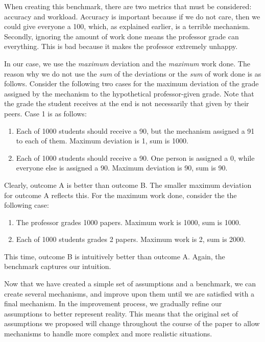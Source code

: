 \documentclass[12pt, Arial]{article}
\begin{document}
When creating this benchmark, there are two metrics that must be considered: accuracy and workload. Accuracy is important because if we do not care, then we could give everyone a 100, which, as explained earlier, is a terrible mechanism. Secondly, ignoring the amount of work done means the professor grade can everything. This is bad because it makes the professor extremely unhappy.

In our case, we use the \emph{maximum} deviation and the \emph{maximum} work done. The reason why we do not use the \emph{sum} of the deviations or the \emph{sum} of work done is as follows. Consider the following two cases for the maximum deviation of the grade assigned by the mechanism to the hypothetical professor-given grade. Note that the grade the student receives at the end is not necessarily that given by their peers. Case 1 is as follows:
\begin{enumerate}[label=\Alph*]
	\item Each of 1000 students should receive a 90, but the mechanism assigned a 91 to each of them. Maximum deviation is 1, sum is 1000.
	\item Each of 1000 students should receive a 90. One person is assigned a 0, while everyone else is assigned a 90. Maximum deviation is 90, sum is 90.
\end{enumerate}
Clearly, outcome A is better than outcome B. The smaller maximum deviation for outcome A reflects this.
For the maximum work done, consider the the following case:
\begin{enumerate}[label=\Alph*]
	\item The professor grades 1000 papers. Maximum work is 1000, sum is 1000.
	\item Each of 1000 students grades 2 papers. Maximum work is 2, sum is 2000.
\end{enumerate}
This time, outcome B is intuitively better than outcome A. Again, the benchmark captures our intuition.


Now that we have created a simple set of assumptions and a benchmark, we can create several mechanisms, and improve upon them until we are satisfied with a final mechanism. In the improvement process, we gradually refine our assumptions to better represent reality. This means that the original set of assumptions we proposed will change throughout the course of the paper to allow mechanisms to handle more complex and more realistic situations.
\end{document}
